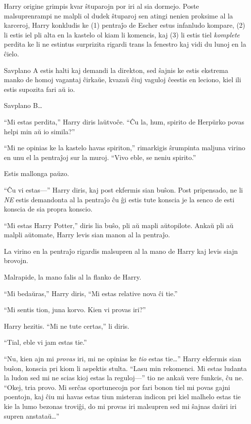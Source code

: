 Harry origine grimpis kvar ŝtuparojn por iri al sia dormejo. Poste
malsuprenrampi ne malpli ol dudek ŝtuparoj sen atingi nenien proksime
al la karceroj, Harry konkludis ke (1) pentraĵo de Escher estus
infanludo kompare, (2) li estis iel pli alta en la kastelo ol kiam li
komencis, kaj (3) li estis tiel \emph{komplete} perdita ke li ne
estintus surprizita rigardi trans la fenestro kaj vidi du lunoj en la
ĉielo.

Savplano A estis halti kaj demandi la direkton, sed ŝajnis ke estis
ekstrema manko de homoj vagantaj ĉirkaŭe, kvazaŭ ĉiuj vaguloj ĉeestis
en leciono, kiel ili estis supozita fari aŭ io.

Savplano B\ldots

``Mi estas perdita,'' Harry diris laŭtvoĉe. ``Ĉu la, hum, spirito de
Herpŭrko povas helpi min aŭ io simila?''

``Mi ne opinias ke la kastelo havas spiriton,'' rimarkigis ŝrumpinta
maljuna virino en unu el la pentraĵoj sur la muroj. ``Vivo eble, se
neniu spirito.''

Estis mallonga paŭzo.

``Ĉu vi estas—'' Harry diris, kaj post ekfermis sian buŝon. Post
pripensado, ne li \emph{NE} estis demandonta al la pentraĵo ĉu ĝi
estis tute konscia je la senco de esti konscia de sia propra konscio.

``Mi estas Harry Potter,'' diris lia buŝo, pli aŭ mapli
aŭtopilote. Ankaŭ pli aŭ malpli aŭtomate, Harry levis sian manon al la
pentraĵo.

La virino en la pentraĵo rigardis malsupren al la mano de Harry kaj
levis siajn brovojn.

Malrapide, la mano falis al la flanko de Harry.

``Mi bedaŭras,'' Harry diris, ``Mi estas relative nova ĉi tie.''

``Mi sentis tion, juna korvo. Kien vi provas iri?''

Harry hezitis. ``Mi ne tute certas,'' li diris.

``Tial, eble vi jam estas tie.''

``Nu, kien ajn mi \emph{provas} iri, mi ne opinias ke \emph{tio} estas
tie\ldots'' Harry ekfermis sian buŝon, konscia pri kiom li aspektis
stulta. ``Lasu min rekomenci. Mi estas ludanta la ludon sed mi ne
scias kioj estas la reguloj—'' tio ne ankaŭ vere funkcis, ĉu
ne. ``Okej, tria provo. Mi serĉas oportunecojn por fari bonon tiel mi
povas gajni poentojn, kaj ĉiu mi havas estas tiun misteran indicon pri
kiel malhelo estas tie kie la lumo bezonas troviĝi, do mi provas iri
malsupren sed mi ŝajnas daŭri iri supren anstataŭ\ldots''

